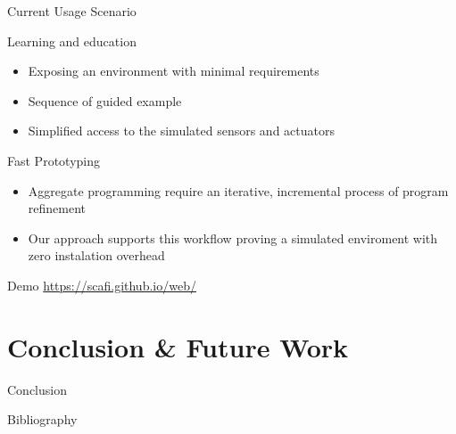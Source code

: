 \documentclass[presentation]{beamer}
\begin{document}
\begin{frame}[fragile]{Current Usage Scenario}

\begin{block}{Learning and education}
  \begin{itemize}
  \item Exposing an environment with minimal requirements
  \item Sequence of guided example
  \item Simplified access to the simulated sensors and actuators
  \end{itemize}
\end{block}

\begin{block}{Fast Prototyping}
  \begin{itemize}
  \item Aggregate programming require an iterative, incremental process of program refinement
  \item Our approach supports this workflow proving a simulated enviroment with zero instalation overhead
  \end{itemize}
  
\end{block}

\end{frame}

\begin{frame}[fragile]{Demo}
  \centering
  \url{https://scafi.github.io/web/}

\end{frame}
  
\section{Conclusion \& Future Work}

\begin{frame}{Conclusion}

%

\end{frame}

\begin{frame}[allowframebreaks]{Bibliography}
\def\bibfont{\footnotesize}
\printbibliography
\end{frame}
\end{document}
